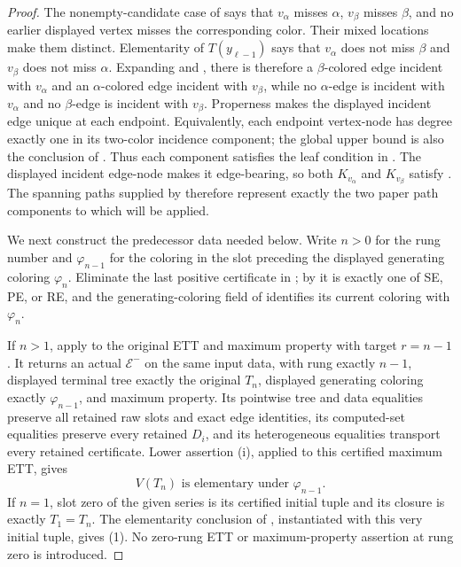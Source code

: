 \begin{proof}
The nonempty-candidate case of
 says that $v_\alpha$ misses
$\alpha$, $v_\beta$ misses $\beta$, and no earlier displayed vertex
misses the corresponding color.  Their mixed locations make them
distinct.  Elementarity of $T(y_{\ell-1})$ says that $v_\alpha$ does
not miss $\beta$ and $v_\beta$ does not miss $\alpha$.  Expanding
 and , there is therefore
a $\beta$-colored edge incident with $v_\alpha$ and an $\alpha$-colored
edge incident with $v_\beta$, while no $\alpha$-edge is incident with
$v_\alpha$ and no $\beta$-edge is incident with $v_\beta$.
Properness makes the displayed incident edge unique at each endpoint.
Equivalently, each endpoint vertex-node has degree exactly one in its
two-color incidence component; the global upper bound is also the
conclusion of .  Thus each
component satisfies the leaf condition in
.  The displayed incident edge-node
makes it edge-bearing, so both $K_{v_\alpha}$ and $K_{v_\beta}$ satisfy
.  The spanning paths supplied
by  therefore represent exactly
the two paper path components to which
 will be applied.

We next construct the predecessor data needed below.  Write $n>0$ for
the rung number and $\varphi_{n-1}$ for the coloring in the slot preceding
the displayed generating coloring $\varphi_n$.  Eliminate the last
positive certificate in ; by
 it is exactly one of SE, PE, or RE, and
the generating-coloring field of 
identifies its current coloring with $\varphi_n$.

If $n>1$, apply  to the original ETT
and maximum property with target $r=n-1$.  It returns an actual
$\mathcal E^{-}$ on the same input data, with rung exactly $n-1$,
displayed terminal tree exactly the original $T_n$, displayed generating
coloring exactly $\varphi_{n-1}$, and maximum property.  Its pointwise
tree and data equalities preserve all retained raw slots and exact edge
identities, its computed-set equalities preserve every retained $D_i$,
and its heterogeneous equalities transport every retained
 certificate.  Lower assertion (i), applied
to this certified maximum ETT, gives
\[
             V(T_n)\text{ is elementary under }\varphi_{n-1}. \tag{1}
\]
If $n=1$, slot zero of the given series is its certified initial tuple
and its closure is exactly $T_1=T_n$.  The elementarity conclusion of
, instantiated with this very initial
tuple, gives (1).  No zero-rung ETT or maximum-property assertion at
rung zero is introduced.


\end{proof}
